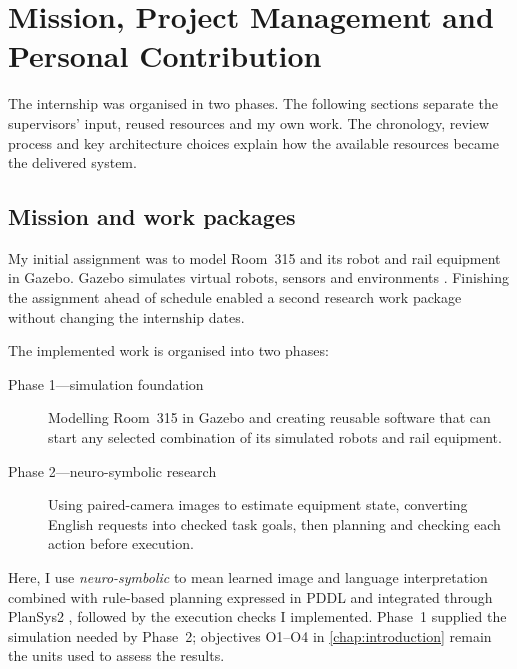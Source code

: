 \chapter[Mission, Project Management and Personal Contribution]
{Mission, Project Management and\\Personal Contribution}
\label{chap:mission}

The internship was organised in two phases. The following sections separate the
supervisors' input, reused resources and my own work. The chronology, review
process and key architecture choices explain how the available resources became
the delivered system.

\section{Mission and work packages}

My initial assignment was to model Room~315 and its robot and rail equipment in
Gazebo. Gazebo simulates virtual robots, sensors and environments
\citep{gazeboharmonic}. Finishing the assignment ahead of schedule enabled a
second research work package without changing the internship dates.

The implemented work is organised into two phases:

\begin{description}
  \item[Phase 1---simulation foundation] Modelling Room~315 in Gazebo and
  creating reusable software that can start any selected combination of its
  simulated robots and rail equipment.
  \item[Phase 2---neuro-symbolic research] Using paired-camera images to
  estimate equipment state, converting English requests into checked task
  goals, then planning and checking each action before execution.
\end{description}

Here, I use \emph{neuro-symbolic} to mean learned image and language
interpretation combined with rule-based planning expressed in PDDL
\citep{pddl} and integrated through PlanSys2 \citep{plansys2}, followed by the
execution checks I implemented. Phase~1 supplied the simulation needed by
Phase~2; objectives O1--O4 in \cref{chap:introduction} remain the units used to
assess the results.

